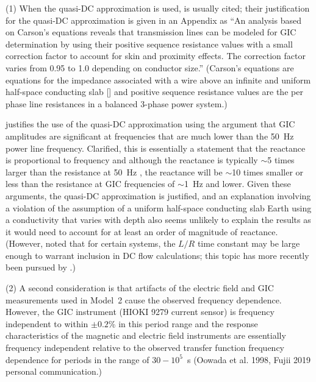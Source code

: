 \documentclass[draft,linenumbers]{agujournal2018}
\begin{document}
(1) When the quasi-DC approximation is used, \cite{Albertson1981} is usually cited; their justification for the quasi-DC approximation is given in an Appendix as ``An analysis based on Carson's equations reveals that transmission lines can be modeled for GIC determination by using their positive sequence resistance values with a small correction factor to account for skin and proximity effects. The correction factor varies from 0.95 to 1.0 depending on conductor size.'' (Carson's equations are equations for the impedance associated with a wire above an infinite and uniform half-space conducting slab [\cite{Carson1926,Grigsby2007}] and positive sequence resistance values are the per phase line resistances in a balanced 3-phase power system.)

\cite{Lehtinen1985} justifies the use of the quasi-DC approximation using the argument that GIC amplitudes are significant at frequencies that are much lower than the 50~Hz power line frequency. Clarified, this is essentially a statement that the reactance is proportional to frequency and although the reactance is typically $\sim$5 times larger than the resistance at 50~Hz \citep{Purchala2005}, the reactance will be $\sim$10 times smaller or less than the resistance at GIC frequencies of $\sim$1~Hz and lower. Given these arguments, the quasi-DC approximation is justified, and an explanation involving a violation of the assumption of a uniform half-space conducting slab Earth using a conductivity that varies with depth also seems unlikely to explain the results as it would need to account for at least an order of magnitude of reactance. (However, \cite{Boteler1994} noted that for certain systems, the $L/R$ time constant may be large enough to warrant inclusion in DC flow calculations; this topic has more recently been pursued by \cite{Oyedokun2013a}.)

(2) A second consideration is that artifacts of the electric field and GIC measurements used in Model~2 cause the observed frequency dependence. However, the GIC instrument (HIOKI 9279 current sensor) is frequency independent to within $\pm 0.2$\% in this period range and the response characteristics of the magnetic and electric field instruments are essentially frequency independent relative to the observed transfer function frequency dependence for periods in the range of $30-10^{5}$~s (Oowada et al. 1998, Fujii 2019 personal communication.)
\end{document}
